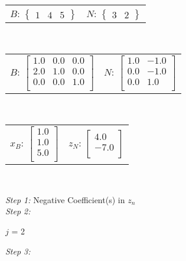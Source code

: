 \documentclass{article}
\begin{document}
\begin{center}
\begin{tabular}{cc}$B$: ${\left\{\begin{array}{ccc}1 & 4 & 5\end{array}\right\}}$ & $N$: ${\left\{\begin{array}{cc}3 & 2\end{array}\right\}}$\end{tabular}\\

\begin{tabular}{cc}$B$: $\left[\begin{array}{ccc}1.0 & 0.0 & 0.0\\ 2.0 & 1.0 & 0.0\\ 0.0 & 0.0 & 1.0\\ \end{array}\right]$ & $N$: $\left[\begin{array}{cc}1.0 & -1.0\\ 0.0 & -1.0\\ 0.0 & 1.0\\ \end{array}\right]$\end{tabular}\\

\begin{tabular}{cc}$x_B$: $\left[\begin{array}{c}1.0\\ 1.0\\ 5.0\\ \end{array}\right]$ & $z_N$: $\left[\begin{array}{c}4.0\\ -7.0\\ \end{array}\right]$\end{tabular}\\

\end{center}
\textit{Step 1:}
Negative Coefficient(s) in $z_n$
\\\textit{Step 2:}\\
\begin{center}
$j$ = 2
\end{center}
\textit{Step 3:}\\
\end{document}
